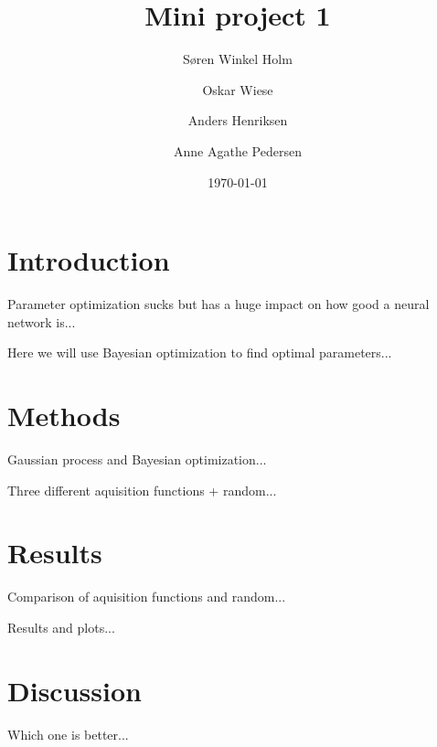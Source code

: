 \documentclass[12pt,fleqn,]{article}
\title{Mini project 1}
\author{Søren Winkel Holm\and Oskar Wiese\and Anders Henriksen\and Anne Agathe Pedersen}
\date{\today}
\begin{document}
\maketitle

\tableofcontents


\section{Introduction}
Parameter optimization sucks but has a huge impact on how good a neural network is...

Here we will use Bayesian optimization to find optimal parameters...


\section{Methods}
Gaussian process and Bayesian optimization...

Three different aquisition functions + random...


\section{Results}
Comparison of aquisition functions and random...

Results and plots...


\section{Discussion}
Which one is better...
\end{document}

